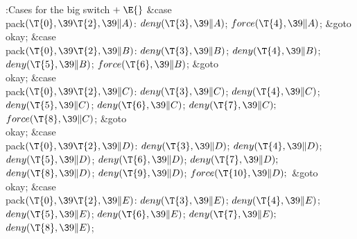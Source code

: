 \Y\B\4:Cases for the big switch\X${}\mathrel+\E{}$\6
\4\&{case} \\{pack}${}(\T{0},\39\T{2},\39\|A){}$:\5
${}\\{deny}(\T{3},\39\|A){}$;\5
${}\\{force}(\T{4},\39\|A){}$;\5
\&{goto} \\{okay};\6
\4\&{case} \\{pack}${}(\T{0},\39\T{2},\39\|B){}$:\5
${}\\{deny}(\T{3},\39\|B){}$;\5
${}\\{deny}(\T{4},\39\|B){}$;\5
${}\\{deny}(\T{5},\39\|B){}$;\5
${}\\{force}(\T{6},\39\|B){}$;\5
\&{goto} \\{okay};\6
\4\&{case} \\{pack}${}(\T{0},\39\T{2},\39\|C){}$:\5
${}\\{deny}(\T{3},\39\|C){}$;\5
${}\\{deny}(\T{4},\39\|C){}$;\5
${}\\{deny}(\T{5},\39\|C){}$;\5
${}\\{deny}(\T{6},\39\|C){}$;\5
${}\\{deny}(\T{7},\39\|C);{}$\6
${}\\{force}(\T{8},\39\|C){}$;\5
\&{goto} \\{okay};\6
\4\&{case} \\{pack}${}(\T{0},\39\T{2},\39\|D){}$:\5
${}\\{deny}(\T{3},\39\|D){}$;\5
${}\\{deny}(\T{4},\39\|D){}$;\5
${}\\{deny}(\T{5},\39\|D){}$;\5
${}\\{deny}(\T{6},\39\|D){}$;\5
${}\\{deny}(\T{7},\39\|D);{}$\6
${}\\{deny}(\T{8},\39\|D){}$;\5
${}\\{deny}(\T{9},\39\|D){}$;\5
${}\\{force}(\T{10},\39\|D);{}$\6
\&{goto} \\{okay};\6
\4\&{case} \\{pack}${}(\T{0},\39\T{2},\39\|E){}$:\5
${}\\{deny}(\T{3},\39\|E){}$;\5
${}\\{deny}(\T{4},\39\|E){}$;\5
${}\\{deny}(\T{5},\39\|E){}$;\5
${}\\{deny}(\T{6},\39\|E){}$;\5
${}\\{deny}(\T{7},\39\|E);{}$\6
${}\\{deny}(\T{8},\39\|E){}$;\5
